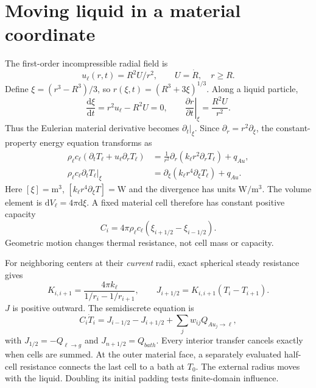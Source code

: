 \documentclass[10pt,letterpaper]{article}
\newcommand{\dd}{\mathrm{d}}
\begin{document}
\section{Moving liquid in a material coordinate}
The first-order incompressible radial field is
\begin{equation}u_\ell(r,t)=R^2U/r^2,\qquad U=\dot R,\quad r\ge R.\end{equation}
Define $\xi=(r^3-R^3)/3$, so $r(\xi,t)=(R^3+3\xi)^{1/3}$. Along a liquid particle,
\begin{equation}\frac{\dd\xi}{\dd t}=r^2u_\ell-R^2U=0,\qquad
\left.\frac{\partial r}{\partial t}\right|_\xi=\frac{R^2U}{r^2}.
\end{equation}
Thus the Eulerian material derivative becomes $\partial_t|_\xi$. Since $\partial_r=r^2\partial_\xi$, the constant-property energy equation transforms as
\begin{align}
\rho_\ell c_\ell (\partial_tT_\ell+u_\ell\partial_rT_\ell)
 &=\frac{1}{r^2}\partial_r(k_\ell r^2\partial_rT_\ell)+q_{Au},\\
\rho_\ell c_\ell\left.\partial_tT_\ell\right|_\xi
 &=\partial_\xi(k_\ell r^4\partial_\xi T_\ell)+q_{Au}.
\end{align}
Here $[\xi]=\mathrm{m^3}$, $[k_\ell r^4\partial_\xi T]=\mathrm W$ and the divergence has units $\mathrm{W/m^3}$. The volume element is $\dd V_\ell=4\pi\dd\xi$. A fixed material cell therefore has constant positive capacity
\begin{equation}C_i=4\pi\rho_\ell c_\ell(\xi_{i+1/2}-\xi_{i-1/2}).\end{equation}
Geometric motion changes thermal resistance, not cell mass or capacity.

For neighboring centers at their \emph{current} radii, exact spherical steady resistance gives
\begin{equation}
K_{i,i+1}=\frac{4\pi k_\ell}{1/r_i-1/r_{i+1}},\qquad
J_{i+1/2}=K_{i,i+1}(T_i-T_{i+1}).
\end{equation}
$J$ is positive outward. The semidiscrete equation is
\begin{equation}C_i\dot T_i=J_{i-1/2}-J_{i+1/2}+\sum_jw_{ij}Q_{Au_j\to\ell},\end{equation}
with $J_{1/2}=-Q_{\ell\to g}$ and $J_{n+1/2}=Q_{bath}$. Every interior transfer cancels exactly when cells are summed. At the outer material face, a separately evaluated half-cell resistance connects the last cell to a bath at $T_0$. The external radius moves with the liquid. Doubling its initial padding tests finite-domain influence.
\end{document}

